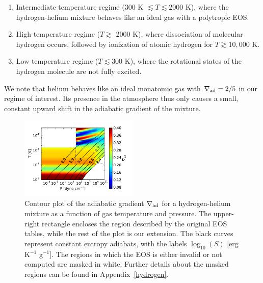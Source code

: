 \documentclass[apj]{emulateapj}
\newcommand{\delad}{\nabla_{\rm ad}}
\newcommand{\App}[1]{Appendix~\ref{#1}}
\begin{document}




\begin{enumerate}
\item Intermediate temperature regime (300 K $\lesssim T \lesssim 2000$ K), where the hydrogen-helium mixture behaves like an ideal gas with a polytropic EOS.
\item High temperature regime ($T \gtrsim$ 2000 K), where dissociation of molecular hydrogen occurs, followed by ionization of atomic hydrogen for $T \gtrsim 10,000$ K.
\item Low temperature regime ($T \lesssim 300$ K), where the rotational states of the hydrogen molecule are not fully excited. %
\end{enumerate}

We note that helium behaves like an ideal monatomic gas with $\delad=2/5$ in our regime of interest.  Its presence in the atmosphere thus only causes a small, constant upward shift in the adiabatic gradient of the mixture.

\begin{figure}[h]
\centering
\includegraphics[width=0.5\textwidth]{../../figs/ModelAtmospheres/RadSelfGravRealEOS/PaperFigs/delad_S_mixt.pdf}
\caption{Contour plot of the adiabatic gradient $\delad$ for a hydrogen-helium mixture as a function of gas temperature and pressure. The upper-right rectangle encloses the region described by the original \citet{saumon95} EOS tables, while the rest of the plot is our extension. The black curves represent constant entropy adiabats, with the labels $\log_{10}(S)$ [erg K$^{-1}$ g$^{-1}$]. The regions in which the EOS is either invalid or not computed are masked in white. Further details about the masked regions can be found in \App{hydrogen}.}
\label{fig:deladmap}
\end{figure}
\end{document}

